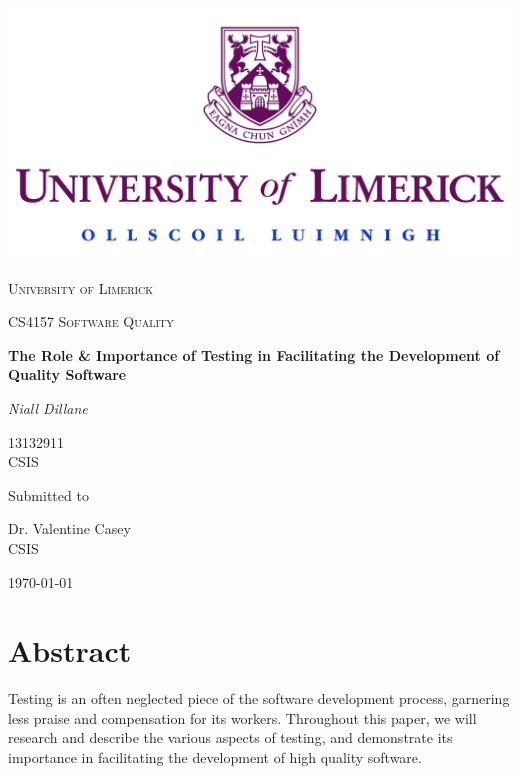 \documentclass[12pt]{article}
\begin{document}
\thispagestyle{empty}
\setlength\headheight{0pt} 
\begin{center}

\begin{center}
\includegraphics[width=0.65\linewidth]{images/UL_logo.jpg}            
\end{center}	

        \vspace{0.25cm}
        {\scshape\LARGE University of Limerick \par}
        \vspace{0.25cm}
        {\scshape\Large CS4157 Software Quality\par}
        \vspace{0.5cm}

        {\Large\bfseries The Role \& Importance of Testing in Facilitating the Development of Quality Software\par}
        
        \vspace{0.5cm}
        {\Large\itshape Niall Dillane\par}
        13132911 \\
        CSIS
        \vspace{0.25cm}

\vspace{1cm}
Submitted to\par
Dr. Valentine Casey \\
CSIS\par
\vspace{1.5cm}
\large
\today

\end{center}

\clearpage
\restoregeometry
\justify

\section*{Abstract}

Testing is an often neglected piece of the software development process, garnering less praise and compensation for its workers. Throughout this paper, we will research and describe the various aspects of testing, and demonstrate its importance in facilitating the development of high quality software. 
\end{document}
